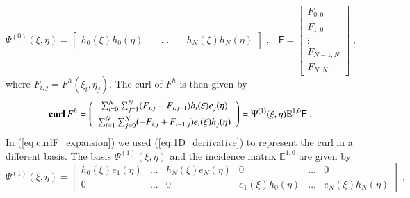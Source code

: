 \documentclass[graybox]{svmult}
\begin{document}
\begin{equation}
\Psi^{(0)}(\xi,\eta) = \left [ \begin{array}{ccc}
h_0(\xi)h_0(\eta) \quad  & \ldots \quad  & h_N(\xi)h_N(\eta)
\end{array} \right ] \;,\;\;\; \mathsf{F} = \left [ \begin{array}{c}
F_{0,0}\\
F_{1,0}\\
\vdots \\
F_{N-1,N}\\
F_{N,N}
\end{array} \right ] \;,
\label{eq:primal_0_basis}
\end{equation}
where $F_{i,j}=F^h(\xi_i,\eta_j)$.
The curl of $F^h$ is then given by
\begin{equation}
\mbox{\bf{curl}}\,F^h = \left ( \begin{array}{c}
\sum_{i=0}^N \sum_{j=1}^N (F_{i,j}-F_{i,j-1})h_i(\xi)e_j(\eta) \\[1ex]
\sum_{i=1}^N \sum_{j=0}^N (-F_{i,j}+F_{i-1,j})e_i(\xi)h_j(\eta)
\end{array} \right ) = \Psi^{(1)}(\xi,\eta) \mathbb{E}^{1,0} \mathsf{F} \;.
\label{eq:curlF_expansion}
\end{equation}
In (\ref{eq:curlF_expansion}) we used (\ref{eq:1D_deriivative}) to represent the curl in a different basis. The basis $\Psi^{(1)}(\xi,\eta)$ and the incidence matrix $\mathbb{E}^{1,0}$ are given by
\begin{equation}
\Psi^{(1)}(\xi,\eta) = \left [ \begin{array}{cccccc}
h_0(\xi)e_1(\eta) & \ldots & h_N(\xi)e_N(\eta) & 0 & \ldots & 0 \\[1ex]
0 & \ldots & 0 & e_1(\xi)h_0(\eta) & \ldots & e_N(\xi)h_N(\eta)
\end{array} \right ] \;,
\label{eq:primal_1_basis}
\end{equation}
\end{document}
